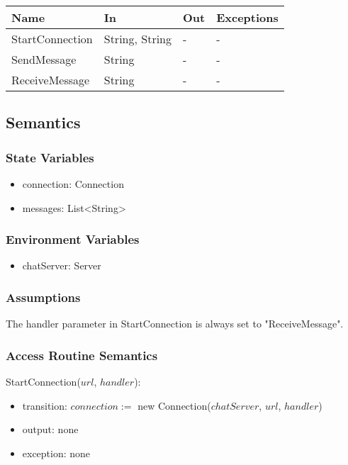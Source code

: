\documentclass[12pt, titlepage]{article}
\begin{document}
\begin{center}
\begin{tabular}{p{4cm} p{3cm} p{3cm} p{4cm}}
\hline
\textbf{Name} & \textbf{In} & \textbf{Out} & \textbf{Exceptions} \\
\hline
StartConnection & String, String & - & - \\
SendMessage & String & - & - \\
ReceiveMessage & String & - & - \\

\hline
\end{tabular}
\end{center}

\subsection{Semantics}

\subsubsection{State Variables}

\begin{itemize}
\item connection: Connection
\item messages: List\textless String\textgreater
\end{itemize}

\subsubsection{Environment Variables}

\begin{itemize}
\item chatServer: Server
\end{itemize}

\subsubsection{Assumptions}

The handler parameter in StartConnection is always set to "ReceiveMessage".

\subsubsection{Access Routine Semantics}

\noindent StartConnection($url$, $handler$):
\begin{itemize}
\item transition: $connection := $ new Connection($chatServer$, $url$, $handler$)
\item output: none
\item exception: none
\end{itemize}
\end{document}
